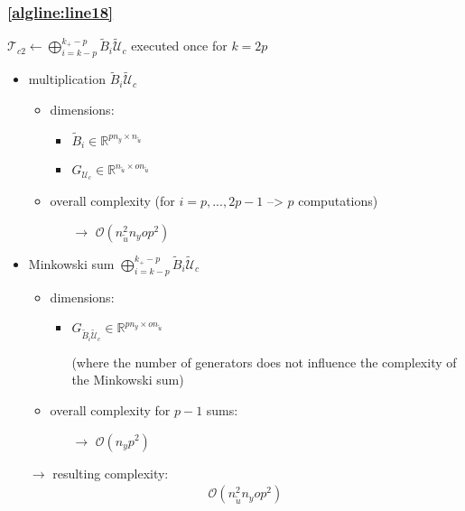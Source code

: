 \documentclass{article}
\begin{document}
\subsubsection{\cref{algline:line18}} 
$\mathcal{T}_{c2} \gets \bigoplus_{i=k-p}^{k_+-p}\tilde{B}_i \tilde{\mathcal{U}}_c$
executed once for $k=2p$
\begin{itemize}
    \item multiplication $\tilde{B}_{i} \tilde{\mathcal{U}}_c$
    \begin{itemize}
        \item dimensions:
        \begin{itemize}
            \item $\tilde{B}_{i} \in \mathbb{R}^{pn_y \times n_{\tilde{u}}}$
            \item $G_{\mathcal{U}_c} \in \mathbb{R}^{n_{\tilde{u}} \times o n_{\tilde{u}}}$
        \end{itemize}
        \item overall complexity (for $i=p,...,2p-1$ --> $p$ computations)
        \begin{itemize}
            \item[$\rightarrow$] $\mathcal{O}(n_{\tilde{u}}^2 n_y o p^2)$
        \end{itemize}
    \end{itemize}
    \item Minkowski sum $\bigoplus_{i=k-p}^{k_+-p}\tilde{B}_i \tilde{\mathcal{U}}_c$
    \begin{itemize}
        \item dimensions:
        \begin{itemize}
            \item $G_{\tilde{B}_{i} \tilde{\mathcal{U}}_c} \in \mathbb{R}^{pn_y \times on_{\tilde{u}}}$ 
            \item[] (where the number of generators does not influence the complexity of the Minkowski sum)
        \end{itemize}
        \item overall complexity for $p-1$ sums:
        \begin{itemize}
            \item[$\rightarrow$] $\mathcal{O}(n_y p^2)$
        \end{itemize}
    \end{itemize}    
    \item[$\rightarrow$] resulting complexity: \begin{align*}
        \mathcal{O}(n_{\tilde{u}}^2 n_y o p^2)
    \end{align*}
\end{itemize}
\end{document}
